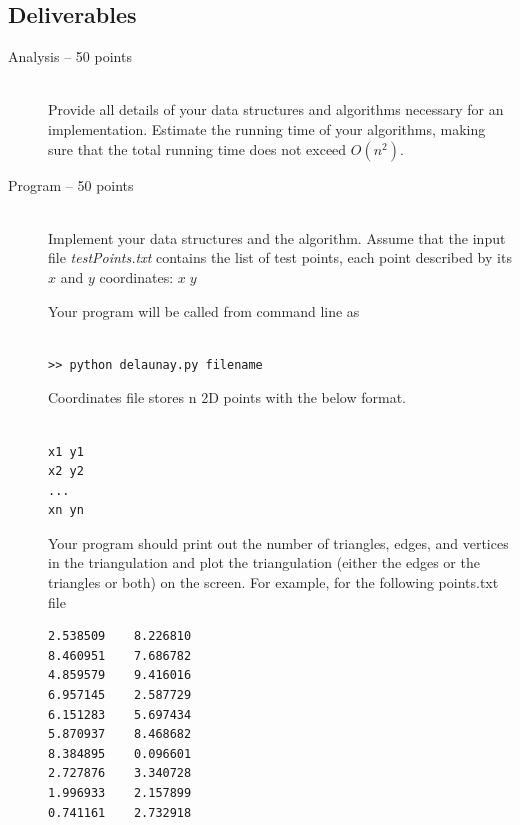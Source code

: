 \documentclass[11pt]{article}
\newcommand{\onefig}[4]{
\begin{figure}[htb]\hrule
\vspace{3pt}
\begin{center}
\texttt{[image: \#1]}
\caption{#2} \label{#3}
\end{center}
\vspace{3pt} \hrule
\end{figure}
}
\begin{document}

\newpage
\subsection*{Deliverables}

\begin{description}
\item [Analysis -- 50 points]\hfil\\ 
Provide all  details of your data structures and algorithms
necessary for an implementation. 
Estimate the running time of your algorithms, making sure that the
total running time does not exceed $O(n^2)$.


\item[Program -- 50 points] \hfil\\ Implement your data structures
and the algorithm.    Assume that  the input file  
{\em testPoints.txt}  contains the list  of test points, each point described by its $x$ and $y$ coordinates:
 $x\;y$

Your program will be called from command line as

\begin{lstlisting}

>> python delaunay.py filename

\end{lstlisting}

Coordinates file stores n 2D points with the below format.

\begin{lstlisting}

x1 y1
x2 y2
...
xn yn

\end{lstlisting}

Your program should print out the number of triangles, edges, and vertices in the triangulation 
and plot the triangulation (either the edges or the triangles or both) on the screen.
For example, for the following points.txt file

\begin{lstlisting}
2.538509	8.226810
8.460951	7.686782
4.859579	9.416016
6.957145	2.587729
6.151283	5.697434
5.870937	8.468682
8.384895	0.096601
2.727876	3.340728
1.996933	2.157899
0.741161	2.732918
\end{lstlisting}


\end{description}
\end{document}
